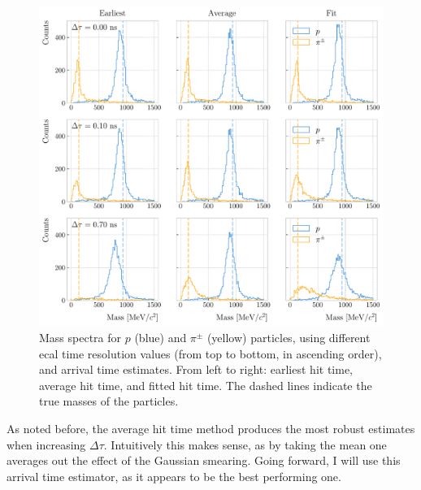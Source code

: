 \begin{figure}[t]
	\centering
	\includegraphics[width=.95\linewidth]{Images/GArSoft_PID/tof/reco_mass_comparison.pdf}
	\caption[Mass spectra for $p$ and $\pi^{\pm}$ particles, using different \gls{ecal} time resolution values and arrival time estimates.]{Mass spectra for $p$ (blue) and $\pi^{\pm}$ (yellow) particles, using different \gls{ecal} time resolution values (from top to bottom, in ascending order), and arrival time estimates. From left to right: earliest hit time, average hit time, and fitted hit time. The dashed lines indicate the true masses of the particles.}
	\label{fig:tof_mass_spectra}
\end{figure}

As noted before, the average hit time method produces the most robust estimates when increasing $\Delta \tau$. Intuitively this makes sense, as by taking the mean one averages out the effect of the Gaussian smearing. Going forward, I will use this arrival time estimator, as it appears to be the best performing one.

